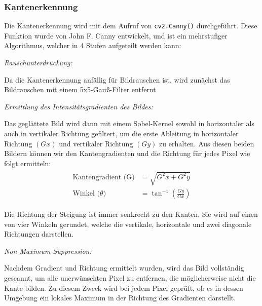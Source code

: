 \subsubsection{Kantenerkennung}
Die Kantenerkennung wird mit dem Aufruf von \verb|cv2.Canny()| durchgeführt. Diese Funktion wurde von John F. Canny entwickelt, und ist ein mehrstufiger Algorithmus, welcher in 4 Stufen aufgeteilt werden kann:
\begin{compactenum}
    \item \textit{Rauschunterdrückung: }
    \begin{compactenum}
        \item Da die Kantenerkennung anfällig für Bildrauschen ist, wird zunächst das Bildrauschen mit einem 5x5-Gauß-Filter entfernt
    \end{compactenum}
    \item \textit{Ermittlung des Intensitätsgradienten des Bildes: }
    \begin{compactenum}
        \item  Das geglättete Bild wird dann mit einem Sobel-Kernel sowohl in horizontaler als auch in vertikaler Richtung gefiltert, um die erste Ableitung in horizontaler Richtung \((Gx)\) und vertikaler Richtung \((Gy)\) zu erhalten. Aus diesen beiden Bildern können wir den Kantengradienten und die Richtung für jedes Pixel wie folgt ermitteln:
        \begin{equation}
            \begin{split}
                \begin{aligned}
                    \text{Kantengradient (G)} &= \sqrt{G^2x+G^2y}\\
                    \text{Winkel (\(\theta\))} &= \tan^{-1}(\frac{Gy}{Gx})
                \end{aligned}
            \end{split}
        \end{equation}
        \item Die Richtung der Steigung ist immer senkrecht zu den Kanten. Sie wird auf einen von vier Winkeln gerundet, welche die vertikale, horizontale und zwei diagonale Richtungen darstellen.
    \end{compactenum}
    \item \textit{Non-Maximum-Suppression: }
    \begin{compactenum}
        \item Nachdem Gradient und Richtung ermittelt wurden, wird das Bild vollständig gescannt, um alle unerwünschten Pixel zu entfernen, die möglicherweise nicht die Kante bilden. Zu diesem Zweck wird bei jedem Pixel geprüft, ob es in dessen Umgebung ein lokales Maximum in der Richtung des Gradienten darstellt.

\end{compactenum}
\end{compactenum}
